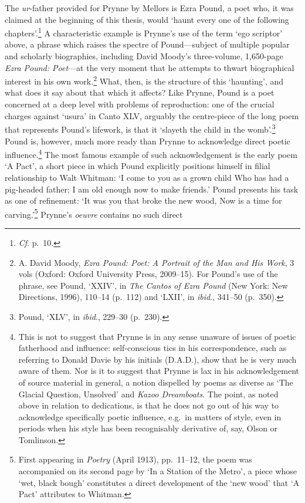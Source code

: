 \documentclass[]{article}
\begin{document}
The \emph{ur}-father provided for Prynne by Mellors is Ezra Pound, a
poet who, it was claimed at the beginning of this thesis, would ‘haunt
every one of the following chapters’.\footnote{\emph{Cf}. p.~10.} A
characteristic example is Prynne’s use of the term ‘ego scriptor’ above,
a phrase which raises the spectre of Pound—subject of multiple popular
and scholarly biographies, including David Moody’s three-volume,
1,650-page \emph{Ezra Pound: Poet}—at the very moment that he attempts
to thwart biographical interest in his own work.\footnote{A. David
  Moody, \emph{Ezra Pound: Poet: A Portrait of the Man and His Work}, 3
  vols (Oxford: Oxford University Press, 2009–15). For Pound’s use of
  the phrase, see Pound, ‘XXIV’, in \emph{The Cantos of Ezra Pound} (New
  York: New Directions, 1996), 110–14 (p.~112) and ‘LXII’, in
  \emph{ibid}., 341–50 (p.~350).} What, then, is the structure of this
‘haunting’, and what does it say about that which it affects? Like
Prynne, Pound is a poet concerned at a deep level with problems of
reproduction: one of the crucial charges against ‘usura’ in Canto XLV,
arguably the centre-piece of the long poem that represents Pound’s
lifework, is that it ‘slayeth the child in the womb’.\footnote{Pound,
  ‘XLV’, in \emph{ibid}., 229–30 (p.~230).} Pound is, however, much more
ready than Prynne to acknowledge direct poetic influence.\footnote{This
  is not to suggest that Prynne is in any sense unaware of issues of
  poetic fatherhood and influence: self-conscious tics in his
  correspondence, such as referring to Donald Davie by his initials
  (D.A.D.), show that he is very much aware of them. Nor is it to
  suggest that Prynne is lax in his acknowledgement of source material
  in general, a notion dispelled by poems as diverse as ‘The Glacial
  Question, Unsolved’ and \emph{Kazoo Dreamboats}. The point, as noted
  above in relation to dedications, is that he does not go out of his
  way to acknowledge specifically poetic influence, e.g.~in matters of
  style, even in periods when his style has been recognisably derivative
  of, say, Olson or Tomlinson.} The most famous example of such
acknowledgement is the early poem ‘A Pact’, a short piece in which Pound
explicitly positions himself in filial relationship to Walt Whitman: ‘I
come to you as a grown child \textbar{} Who has had a pig-headed father;
\textbar{} I am old enough now to make friends.’ Pound presents his task
as one of refinement: ‘It was you that broke the new wood, \textbar{}
Now is a time for carving.’\footnote{First appearing in \emph{Poetry}
  (April 1913), pp.~11–12, the poem was accompanied on its second page
  by ‘In a Station of the Metro’, a piece whose ‘wet, black bough’
  constitutes a direct development of the ‘new wood’ that ‘A Pact’
  attributes to Whitman.} Prynne’s \emph{oeuvre} contains no such direct
\end{document}
